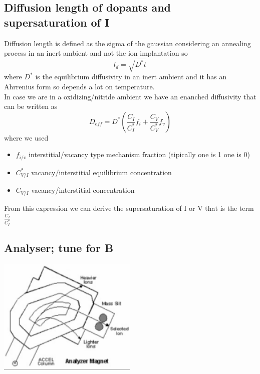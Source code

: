 \subsection{Diffusion length of dopants and supersaturation of I}
Diffusion length is defined as the sigma of the gaussian considering an annealing process in an inert ambient and not the ion implantation so 
\begin{equation}
l_d=\sqrt{D^*t}
\end{equation}
where $D^*$ is the equilibrium diffusivity in an inert ambient and it has an Ahrrenius form so depends a lot on temperature.\\
In case we are in a oxidizing/nitride ambient we have an enanched diffusivity that can be written as
\begin{equation}
D_{eff}=D^*\left(\frac{C_I}{C_I^*}f_i+\frac{C_V}{C_V^*}f_v \right)
\end{equation}
where we used 
\begin{itemize}
\item $f_{i/v}$ interstitial/vacancy type mechanism fraction (tipically one is 1 one is 0)
\item $C_{V/I}^*$ vacancy/interstitial equilibrium concentration
\item $C_{V/I}$ vacancy/interstitial concentration
\end{itemize}
From this expression we can derive the supersaturation of I or V that is the term $\frac{C_I}{C_I^*}$


\subsection{Analyser; tune for B}

\centering
\includegraphics[width=0.5\textwidth]{B-curve.png}\\
\raggedright

